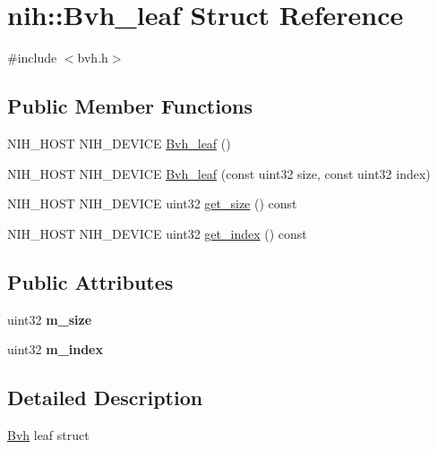 \hypertarget{structnih_1_1_bvh__leaf}{
\section{nih\-:\-:\-Bvh\-\_\-leaf \-Struct \-Reference}
\label{structnih_1_1_bvh__leaf}
}


{\ttfamily \#include $<$bvh.\-h$>$}

\subsection*{\-Public \-Member \-Functions}
\begin{DoxyCompactItemize}
\item 
\-N\-I\-H\-\_\-\-H\-O\-S\-T \-N\-I\-H\-\_\-\-D\-E\-V\-I\-C\-E \hyperlink{structnih_1_1_bvh__leaf_a575996afc9073a3fb11b6b0de62ba9a5}{\-Bvh\-\_\-leaf} ()
\item 
\-N\-I\-H\-\_\-\-H\-O\-S\-T \-N\-I\-H\-\_\-\-D\-E\-V\-I\-C\-E \hyperlink{structnih_1_1_bvh__leaf_a9b8f2fd33192d9dd22fd90d36cd745f5}{\-Bvh\-\_\-leaf} (const uint32 size, const uint32 index)
\item 
\-N\-I\-H\-\_\-\-H\-O\-S\-T \-N\-I\-H\-\_\-\-D\-E\-V\-I\-C\-E uint32 \hyperlink{structnih_1_1_bvh__leaf_a4d533be98689fa2737e74596225724ce}{get\-\_\-size} () const 
\item 
\-N\-I\-H\-\_\-\-H\-O\-S\-T \-N\-I\-H\-\_\-\-D\-E\-V\-I\-C\-E uint32 \hyperlink{structnih_1_1_bvh__leaf_a47425adef0fb701736abb70bed00334c}{get\-\_\-index} () const 
\end{DoxyCompactItemize}
\subsection*{\-Public \-Attributes}
\begin{DoxyCompactItemize}
\item 
\hypertarget{structnih_1_1_bvh__leaf_ac43eb244b296e0e745dbeb11a66a14d2}{
uint32 {\bfseries m\-\_\-size}}
\label{structnih_1_1_bvh__leaf_ac43eb244b296e0e745dbeb11a66a14d2}

\item 
\hypertarget{structnih_1_1_bvh__leaf_a839a4c7ec5973bd91071a97dc4761cb4}{
uint32 {\bfseries m\-\_\-index}}
\label{structnih_1_1_bvh__leaf_a839a4c7ec5973bd91071a97dc4761cb4}

\end{DoxyCompactItemize}


\subsection{\-Detailed \-Description}
\hyperlink{structnih_1_1_bvh}{\-Bvh} leaf struct 

